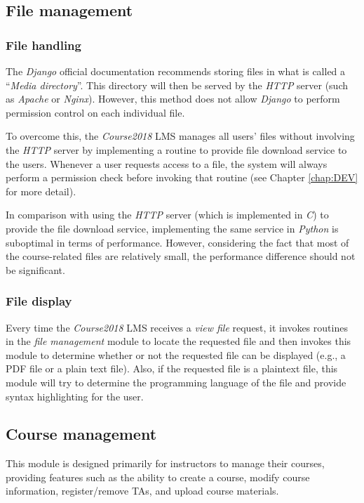 \subsection{File management}

\subsubsection{File handling}
The \emph{Django} official documentation recommends storing files in what is
called a ``\emph{Media directory}''. This directory will then be served by the
\emph{HTTP} server \cite{CdjangoManagingFiles}
(such as \emph{Apache} or \emph{Nginx}). However, this method does not allow
\emph{Django} to perform permission control on each individual file.

\medskip

To overcome this, the \emph{Course2018} LMS manages all users' files without
involving the \emph{HTTP} server by implementing a routine to provide file
download service to the users. Whenever a user requests access to a file, the system
will always perform a permission check before invoking that routine
(see Chapter \ref{chap:DEV} for more detail).

\medskip

In comparison with
using the \emph{HTTP} server (which is implemented in \emph{C}) to provide
the file download service,
implementing the same service in \emph{Python} is suboptimal in terms of
performance.
However, considering the fact that most of the course-related
files are relatively small, the performance difference should
not be significant.

\subsubsection{File display}
Every time the \emph{Course2018} LMS receives a \emph{view file} request,
it invokes routines in the \emph{file management} module to locate the
requested file and then invokes this module to determine whether or not the
requested file can be displayed (e.g., a PDF file or a plain text file). Also,
if the requested file is a plaintext file, this module will try to determine
the programming language of the file and provide syntax highlighting for the
user.

\subsection{Course management}
This module is designed primarily for instructors to manage their courses, 
providing features such as the ability to create a course, modify course information,
register/remove TAs, and upload course materials.

